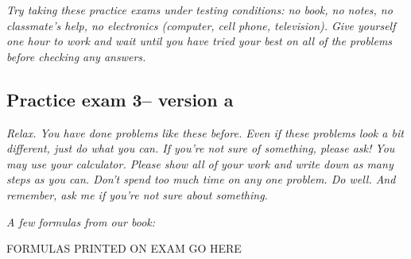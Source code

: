 \documentclass[12pt]{article}
\begin{document}
\emph{Try taking these practice exams under testing conditions:  no book, no notes, no classmate's help, no electronics (computer, cell phone, television). Give yourself one hour to work and wait until you have tried your best on all of the problems before checking any answers.}
\bigskip

\subsection*{Practice exam 3-- version a}
\bigskip
 \emph{Relax.  You have done problems like these before.  Even if these problems look a bit different, just do what you can.  If you're not sure of something, please ask! You may use your calculator.  Please show all of your work and write down as many steps as you can.  Don't spend too much time on any one problem.  Do well.  And remember, ask me if you're not sure about something.}
 
\bigskip
 
\emph{A few formulas from our book:}

\begin{center}

FORMULAS PRINTED ON EXAM GO HERE

\end{center}

\hspace{-.25in} \hrulefill
\end{document}
